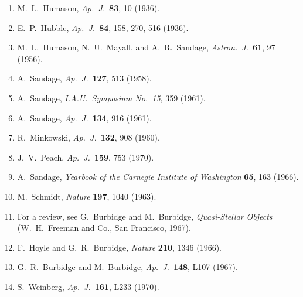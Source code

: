 \begin{enumerate}
  \item{}\label{ch14-ref-47}
  M.~L.~Humason, \emph{Ap.\ J.}\ \textbf{83}, 10 (1936).

  \item{}\label{ch14-ref-48}
  E.~P.~Hubble, \emph{Ap.\ J.}\ \textbf{84}, 158, 270, 516 (1936).

  \item{}\label{ch14-ref-49}
  M.~L.~Humason, N.~U.~Mayall, and A.~R.~Sandage,
  \emph{Astron.\ J.}\ \textbf{61}, 97 (1956).

  \item{}\label{ch14-ref-50}
  A.~Sandage, \emph{Ap.\ J.}\ \textbf{127}, 513 (1958).

  \item{}\label{ch14-ref-51}
  A.~Sandage, \emph{I.A.U.\ Symposium No.\ 15}, 359 (1961).

  \item{}\label{ch14-ref-52}
  A.~Sandage, \emph{Ap.\ J.}\ \textbf{134}, 916 (1961).

  \item{}\label{ch14-ref-53}
  R.~Minkowski, \emph{Ap.\ J.}\ \textbf{132}, 908 (1960).

  \item{}\label{ch14-ref-54}
  J.~V.~Peach, \emph{Ap.\ J.}\ \textbf{159}, 753 (1970).

  \item{}\label{ch14-ref-55}
  A.~Sandage, \emph{Yearbook of the Carnegie Institute of Washington}
  \textbf{65}, 163 (1966).

  \item{}\label{ch14-ref-56}
  M.~Schmidt, \emph{Nature} \textbf{197}, 1040 (1963).

  \item{}\label{ch14-ref-57}
  For a review, see G.~Burbidge and M.~Burbidge,
  \emph{Quasi-Stellar Objects}
  (W.~H.~Freeman and Co., San Francisco, 1967).

  \item{}\label{ch14-ref-58}
  F.~Hoyle and G.~R.~Burbidge, \emph{Nature} \textbf{210}, 1346 (1966).

  \item{}\label{ch14-ref-59}
  G.~R.~Burbidge and M.~Burbidge,
  \emph{Ap.\ J.}\ \textbf{148}, L107 (1967).

  \item{}\label{ch14-ref-60}
  S.~Weinberg, \emph{Ap.\ J.}\ \textbf{161}, L233 (1970).


\end{enumerate}
